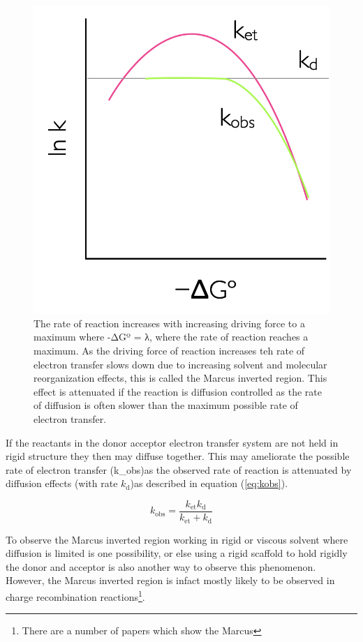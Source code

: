 \documentclass[
]{book}
\begin{document}
\begin{figure}

{\centering \includegraphics[width=0.5\linewidth]{images/marcusinverted} 

}

\caption{The rate of reaction increases with increasing driving force to a maximum where -ΔGº = λ, where the rate of reaction reaches a maximum. As the driving force of reaction increases teh rate of electron transfer slows down due to increasing solvent and molecular reorganization effects, this is called the Marcus inverted region. This effect is attenuated if the reaction is diffusion controlled as the rate of diffusion is often slower than the maximum possible rate of electron transfer.}\label{fig:marcusinverted}
\end{figure}

If the reactants in the donor acceptor electron transfer system are not held in rigid structure they then may diffuse together. This may ameliorate the possible rate of electron transfer (k\_\textrm{obs})as the observed rate of reaction is attenuated by diffusion effects (with rate \(k_\textrm{d}\))as described in equation (\eqref{eq:kobs}).

\begin{equation}
k_\textrm{obs}= \frac{k_\textrm{et}k_\textrm{d}}{k_\textrm{et}+k_\textrm{d}}
\label{eq:kobs}
\end{equation}

To observe the Marcus inverted region working in rigid or viscous solvent where diffusion is limited is one possibility, or else using a rigid scaffold to hold rigidly the donor and acceptor is also another way to observe this phenomenon. However, the Marcus inverted region is infact mostly likely to be observed in charge recombination reactions\footnote{There are a number of papers which show the Marcus }.
\end{document}
